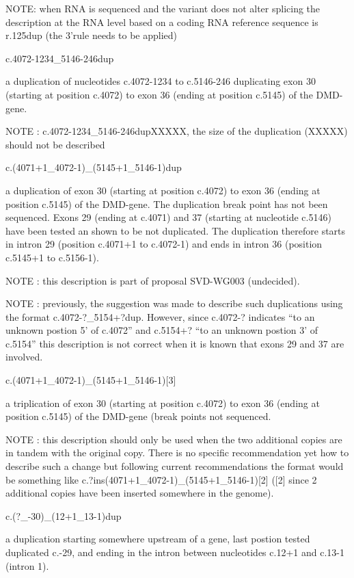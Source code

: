 \documentclass{book}
\begin{document}
	NOTE: when RNA is sequenced and the variant does not alter splicing the description at the RNA level based on a coding RNA reference sequence is r.125dup (the 3’rule needs to be applied)

	c.4072-1234\_5146-246dup

	a duplication of nucleotides c.4072-1234 to c.5146-246 duplicating exon 30 (starting at position c.4072) to exon 36 (ending at position c.5145) of the DMD-gene.

	NOTE : c.4072-1234\_5146-246dupXXXXX, the size of the duplication (XXXXX) should not be described

	c.(4071+1\_4072-1)\_(5145+1\_5146-1)dup

	a duplication of exon 30 (starting at position c.4072) to exon 36 (ending at position c.5145) of the DMD-gene. The duplication break point has not been sequenced. Exons 29 (ending at c.4071) and 37 (starting at nucleotide c.5146) have been tested an shown to be not duplicated. The duplication therefore starts in intron 29 (position c.4071+1 to c.4072-1) and ends in intron 36 (position c.5145+1 to c.5156-1).

	NOTE : this description is part of proposal SVD-WG003 (undecided).

	NOTE : previously, the suggestion was made to describe such duplications using the format c.4072-?\_5154+?dup. However, since c.4072-? indicates “to an unknown postion 5’ of c.4072” and c.5154+? “to an unknown postion 3’ of c.5154” this description is not correct when it is known that exons 29 and 37 are involved.

	c.(4071+1\_4072-1)\_(5145+1\_5146-1)[3]

	a triplication of exon 30 (starting at position c.4072) to exon 36 (ending at position c.5145) of the DMD-gene (break points not sequenced.

	NOTE : this description should only be used when the two additional copies are in tandem with the original copy. There is no specific recommendation yet how to describe such a change but following current recommendations the format would be something like c.?ins(4071+1\_4072-1)\_(5145+1\_5146-1)[2] ([2] since 2 additional copies have been inserted somewhere in the genome).

	c.(?\_-30)\_(12+1\_13-1)dup

	a duplication starting somewhere upstream of a gene, last postion tested duplicated c.-29, and ending in the intron between nucleotides c.12+1 and c.13-1 (intron 1).
\end{document}
